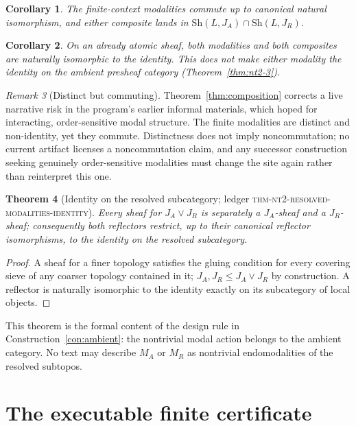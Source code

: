 \documentclass[11pt]{amsart}
\newtheorem{theorem}{Theorem}[section]
\newtheorem{corollary}[theorem]{Corollary}
\theoremstyle{definition}
\theoremstyle{remark}
\newtheorem{remark}[theorem]{Remark}
\newcommand{\Sh}{\mathrm{Sh}}
\begin{document}
\begin{corollary}\label{cor:commute}
The finite-context modalities commute up to canonical natural isomorphism, and either composite lands in $\Sh(L,J_A)\cap\Sh(L,J_R)$.
\end{corollary}

\begin{corollary}\label{cor:atomicfix}
On an already atomic sheaf, both modalities and both composites are naturally isomorphic to the identity. This does not make either modality the identity on the ambient presheaf category (Theorem~\ref{thm:nt2-3}).
\end{corollary}

\begin{remark}[Distinct but commuting]\label{rem:narrative}
Theorem~\ref{thm:composition} corrects a live narrative risk in the program's earlier informal materials, which hoped for interacting, order-sensitive modal structure. The finite modalities are distinct and non-identity, yet they commute. Distinctness does not imply noncommutation; no current artifact licenses a noncommutation claim, and any successor construction seeking genuinely order-sensitive modalities must change the site again rather than reinterpret this one.
\end{remark}

\begin{theorem}[Identity on the resolved subcategory; \textnormal{ledger \textsc{thm-nt2-resolved-modalities-identity}}]\label{thm:resolved-identity}
Every sheaf for $J_A\vee J_R$ is separately a $J_A$-sheaf and a $J_R$-sheaf; consequently both reflectors restrict, up to their canonical reflector isomorphisms, to the identity on the resolved subcategory.
\end{theorem}

\begin{proof}
A sheaf for a finer topology satisfies the gluing condition for every covering sieve of any coarser topology contained in it; $J_A,J_R\le J_A\vee J_R$ by construction. A reflector is naturally isomorphic to the identity exactly on its subcategory of local objects.
\end{proof}

This theorem is the formal content of the design rule in Construction~\ref{con:ambient}: the nontrivial modal action belongs to the ambient category. No text may describe $M_A$ or $M_R$ as nontrivial endomodalities of the resolved subtopos.

\section{The executable finite certificate}\label{sec:certificate}
\end{document}
